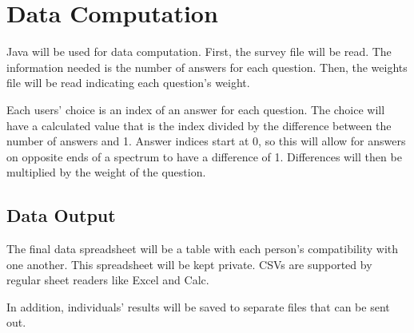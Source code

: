 \documentclass[12pt]{article}
\begin{document}
\section{Data Computation}
Java will be used for data computation. First, the survey file will be read.
The information needed is the number of answers for each question. Then, the
weights file will be read indicating each question's weight.

Each users' choice is an index of an answer for each question. The choice will
have a calculated value that is the index divided by the difference between the
number of answers and 1. Answer indices start at 0, so this will allow for
answers on opposite ends of a spectrum to have a difference of 1. Differences
will then be multiplied by the weight of the question.

\subsection{Data Output}
The final data spreadsheet will be a table with each person's compatibility with
one another. This spreadsheet will be kept private. CSVs are supported by
regular sheet readers like Excel and Calc.

In addition, individuals' results will be saved to separate files that can be
sent out.
\end{document}
